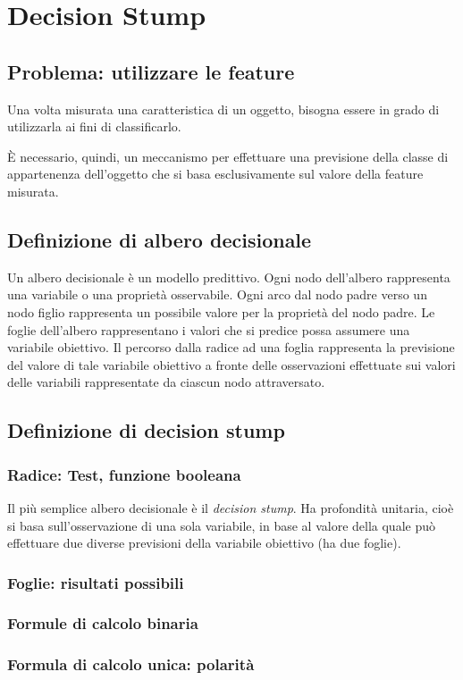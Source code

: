     \section{Decision Stump}
    \label{sec:decision_stump}
        \subsection{Problema: utilizzare le feature}
            Una volta misurata una caratteristica di un oggetto, bisogna essere in grado di utilizzarla ai fini di classificarlo.

            È necessario, quindi, un meccanismo per effettuare una previsione della classe di appartenenza dell'oggetto che si basa esclusivamente sul valore della feature misurata.

        \subsection{Definizione di albero decisionale}
        Un albero decisionale è un modello predittivo. Ogni nodo dell'albero rappresenta una variabile o una proprietà osservabile. Ogni arco dal nodo padre verso un nodo figlio rappresenta un possibile valore per la proprietà del nodo padre. Le foglie dell'albero rappresentano i valori che si predice possa assumere una variabile obiettivo. Il percorso dalla radice ad una foglia rappresenta la previsione del valore di tale variabile obiettivo a fronte delle osservazioni effettuate sui valori delle variabili rappresentate da ciascun nodo attraversato.
        \subsection{Definizione di decision stump} %
            \subsubsection{Radice: Test, funzione booleana}
            Il più semplice albero decisionale è il \emph{decision stump}. Ha profondità unitaria, cioè si basa sull'osservazione di una sola variabile, in base al valore della quale può effettuare due diverse previsioni della variabile obiettivo (ha due foglie).
            \subsubsection{Foglie: risultati possibili}
            \subsubsection{Formule di calcolo binaria}
            \subsubsection{Formula di calcolo unica: polarità}
